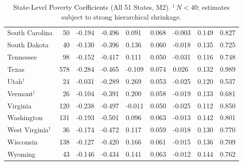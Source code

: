 \begin{table}[htbp]
\begin{tabular}{lrlllllll}
  South Carolina &  50 & -0.194 & -0.496 & 0.091 & 0.068 & -0.003 & 0.149 & 0.827 \\ 
  South Dakota &  40 & -0.130 & -0.396 & 0.136 & 0.060 & -0.018 & 0.135 & 0.725 \\ 
  Tennessee &  98 & -0.152 & -0.417 & 0.111 & 0.050 & -0.031 & 0.116 & 0.748 \\ 
  Texas & 578 & -0.284 & -0.465 & -0.109 & 0.074 & 0.026 & 0.132 & 0.989 \\ 
  Utah$^{\dagger}$ &  24 & -0.031 & -0.289 & 0.269 & 0.053 & -0.025 & 0.120 & 0.537 \\ 
  Vermont$^{\dagger}$ &  26 & -0.104 & -0.391 & 0.200 & 0.058 & -0.019 & 0.133 & 0.681 \\ 
  Virginia & 120 & -0.238 & -0.497 & -0.011 & 0.050 & -0.025 & 0.112 & 0.850 \\ 
  Washington & 131 & -0.193 & -0.501 & 0.096 & 0.063 & -0.013 & 0.142 & 0.801 \\ 
  West Virginia$^{\dagger}$ &  36 & -0.174 & -0.472 & 0.117 & 0.059 & -0.018 & 0.130 & 0.770 \\ 
  Wisconsin & 138 & -0.127 & -0.420 & 0.166 & 0.061 & -0.015 & 0.136 & 0.709 \\ 
  Wyoming &  43 & -0.146 & -0.434 & 0.141 & 0.063 & -0.012 & 0.144 & 0.762 \\ 
   \bottomrule
\end{tabular}
\caption{State-Level Poverty Coefficients (All 51 States, M2). $^{\dagger}$\,$N < 40$; estimates subject to strong hierarchical shrinkage.} 
\end{table}
